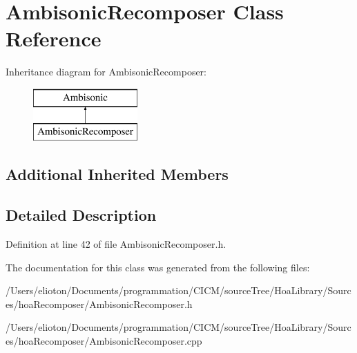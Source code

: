 \hypertarget{class_ambisonic_recomposer}{\section{Ambisonic\-Recomposer Class Reference}
\label{class_ambisonic_recomposer}
}
Inheritance diagram for Ambisonic\-Recomposer\-:\begin{figure}[H]
\begin{center}
\leavevmode
\includegraphics[height=2.000000cm]{class_ambisonic_recomposer}
\end{center}
\end{figure}
\subsection*{Additional Inherited Members}


\subsection{Detailed Description}


Definition at line 42 of file Ambisonic\-Recomposer.\-h.



The documentation for this class was generated from the following files\-:\begin{DoxyCompactItemize}
\item 
/\-Users/elioton/\-Documents/programmation/\-C\-I\-C\-M/source\-Tree/\-Hoa\-Library/\-Sources/hoa\-Recomposer/Ambisonic\-Recomposer.\-h\item 
/\-Users/elioton/\-Documents/programmation/\-C\-I\-C\-M/source\-Tree/\-Hoa\-Library/\-Sources/hoa\-Recomposer/Ambisonic\-Recomposer.\-cpp\end{DoxyCompactItemize}
